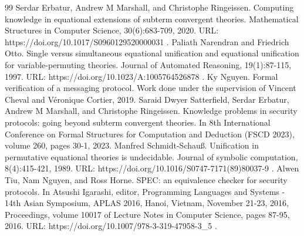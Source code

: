 \begin{thebibliography}{99}
 Serdar Erbatur, Andrew M Marshall, and Christophe Ringeissen. Computing knowledge in equational extensions of subterm convergent theories. Mathematical Structures in Computer Science, 30(6):683-709, 2020. URL: https://doi.org/10.1017/S0960129520000031 .
 Paliath Narendran and Friedrich Otto. Single versus simultaneous equational unification and equational unification for variable-permuting theories. Journal of Automated Reasoning, 19(1):87-115, 1997. URL: https://doi.org/10.1023/A:1005764526878 .
 Ky Nguyen. Formal verification of a messaging protocol. Work done under the supervision of Vincent Cheval and Véronique Cortier, 2019.
 Saraid Dwyer Satterfield, Serdar Erbatur, Andrew M Marshall, and Christophe Ringeissen. Knowledge problems in security protocols: going beyond subterm convergent theories. In 8th International Conference on Formal Structures for Computation and Deduction (FSCD 2023), volume 260, pages 30-1, 2023.
 Manfred Schmidt-Schauß. Unification in permutative equational theories is undecidable. Journal of symbolic computation, 8(4):415-421, 1989. URL: https://doi.org/10.1016/S0747-7171(89)80037-9 .
 Alwen Tiu, Nam Nguyen, and Ross Horne. SPEC: an equivalence checker for security protocols. In Atsushi Igarashi, editor, Programming Languages and Systems - 14th Asian Symposium, APLAS 2016, Hanoi, Vietnam, November 21-23, 2016, Proceedings, volume 10017 of Lecture Notes in Computer Science, pages 87-95, 2016. URL: https://doi.org/10.1007/978-3-319-47958-3\_5 .
\end{thebibliography}
